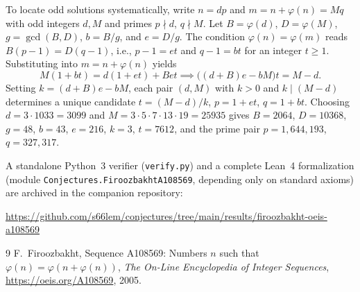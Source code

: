 \documentclass[11pt]{article}
\begin{document}
To locate odd solutions systematically, write $n = d p$ and $m = n + \varphi(n) = M q$ with odd integers $d, M$ and primes $p \nmid d$, $q \nmid M$. Let $B = \varphi(d)$, $D = \varphi(M)$, $g = \gcd(B, D)$, $b = B/g$, and $e = D/g$. The condition $\varphi(n) = \varphi(m)$ reads $B(p - 1) = D(q - 1)$, i.e., $p - 1 = e t$ and $q - 1 = b t$ for an integer $t \ge 1$. Substituting into $m = n + \varphi(n)$ yields
\[
  M(1 + b t) = d(1 + e t) + B e t \implies \bigl((d + B)e - b M\bigr) t = M - d.
\]
Setting $k = (d + B)e - b M$, each pair $(d, M)$ with $k > 0$ and $k \mid (M - d)$ determines a unique candidate $t = (M - d)/k$, $p = 1 + e t$, $q = 1 + b t$. Choosing $d = 3 \cdot 1033 = 3099$ and $M = 3 \cdot 5 \cdot 7 \cdot 13 \cdot 19 = 25935$ gives $B = 2064$, $D = 10368$, $g = 48$, $b = 43$, $e = 216$, $k = 3$, $t = 7612$, and the prime pair $p = 1{,}644{,}193$, $q = 327{,}317$.

A standalone Python~3 verifier (\texttt{verify.py}) and a complete Lean~4 formalization (module \texttt{Conjectures.FiroozbakhtA108569}, depending only on standard axioms) are archived in the companion repository:
\begin{center}
\url{https://github.com/s66lem/conjectures/tree/main/results/firoozbakht-oeis-a108569}
\end{center}

\begin{thebibliography}{9}
F.~Firoozbakht, Sequence A108569: Numbers $n$ such that $\varphi(n) = \varphi(n + \varphi(n))$, \emph{The On-Line Encyclopedia of Integer Sequences}, \url{https://oeis.org/A108569}, 2005.
\end{thebibliography}
\end{document}
